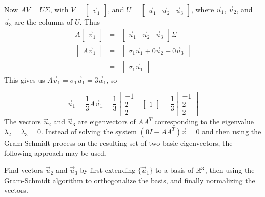 \documentclass{ximera}
\begin{document}
\begin{example}
\begin{explanation}
\noindent Now $AV=U\Sigma$, with
$V=\left[\begin{array}{r}\vec{v}_1 \end{array}\right]$,
and $U=\left[\begin{array}{rrr} \vec{u}_1 & \vec{u}_2 & \vec{u}_3 \end{array}\right]$,
where $\vec{u}_1$, $\vec{u}_2$, and $\vec{u}_3$ are the columns of $U$.
Thus
\begin{eqnarray*}
A\left[\begin{array}{r} \vec{v}_1 \end{array}\right]
&=& \left[\begin{array}{rrr} \vec{u}_1 & \vec{u}_2 & \vec{u}_3 \end{array}\right]\Sigma\\
\left[\begin{array}{r} A\vec{v}_1 \end{array}\right]
&=& \left[\begin{array}{r} \sigma_1 \vec{u}_1+0\vec{u}_2+0\vec{u}_3 \end{array}\right]\\
&=& \left[\begin{array}{r} \sigma_1 \vec{u}_1 \end{array}\right]
\end{eqnarray*}
This gives us $A\vec{v}_1=\sigma_1 \vec{u}_1= 3\vec{u}_1$, so
 
\[ \vec{u}_1 = \frac{1}{3}A\vec{v}_1
= \frac{1}{3}
\left[\begin{array}{r} -1 \\ 2 \\ 2 \end{array}\right]
\left[\begin{array}{r} 1 \end{array}\right]
= \frac{1}{3}
\left[\begin{array}{r} -1 \\ 2 \\ 2 \end{array}\right]\]
The vectors $\vec{u}_2$ and $\vec{u}_3$ are eigenvectors of $AA^T$ corresponding
to the eigenvalue $\lambda_2=\lambda_3=0$.
Instead of solving the system $(0I-AA^T)\vec{x}= 0$ and then using the
Gram-Schmidt process on the resulting set of
two basic eigenvectors, the following approach may be used.
 
 
Find vectors $\vec{u}_2$ and $\vec{u}_3$ by first extending $\{ \vec{u}_1\}$ to a basis of
$\mathbb{R}^3$, then using the Gram-Schmidt algorithm to orthogonalize the basis,
and finally normalizing the vectors.
 

\end{explanation}
\end{example}
\end{document}
